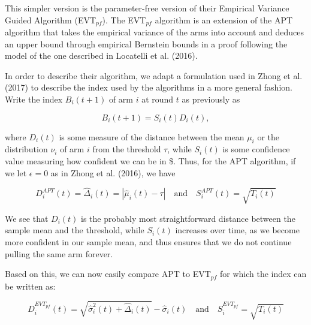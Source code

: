 \documentclass[11pt,]{article}
\begin{document}
This simpler version is the parameter-free version of their Empirical
Variance Guided Algorithm (EVT\(_{pf}\)). The EVT\(_{pf}\) algorithm is
an extension of the APT algorithm that takes the empirical variance of
the arms into account and deduces an upper bound through empirical
Bernstein bounds in a proof following the model of the one described in
Locatelli et al. (2016).

In order to describe their algorithm, we adapt a formulation used in
Zhong et al. (2017) to describe the index used by the algorithms in a
more general fashion. Write the index \(B_i(t+1)\) of arm \(i\) at round
\(t\) as previously as

\[
B_i(t+1) = S_i(t) D_i(t),
\]

where \(D_i(t)\) is some measure of the distance between the mean
\(\mu_i\) or the distribution \(\nu_i\) of arm \(i\) from the threshold
\(\tau\), while \(S_i(t)\) is some confidence value measuring how
confident we can be in \$. Thus, for the APT algorithm, if we let
\(\epsilon = 0\) as in Zhong et al. (2016), we have

\[
D_i^{APT}(t) = \hat{\Delta}_i(t) = |\hat{\mu}_i(t) - \tau| \quad \text{and} \quad S_i^{APT}(t) = \sqrt{T_i(t)}
\]

We see that \(D_i(t)\) is the probably most straightforward distance
between the sample mean and the threshold, while \(S_i(t)\) increases
over time, as we become more confident in our sample mean, and thus
ensures that we do not continue pulling the same arm forever.

Based on this, we can now easily compare APT to EVT\(_{pf}\) for which
the index can be written as:

\[
D_i^{EVT_{pf}}(t) = \sqrt{\hat{\sigma}^2_{i}(t) + \hat{\Delta}_i(t)} - \hat{\sigma}_i(t) \quad \text{and} \quad S_i^{EVT_{pf}} = \sqrt{T_i(t)}
\]
\end{document}
